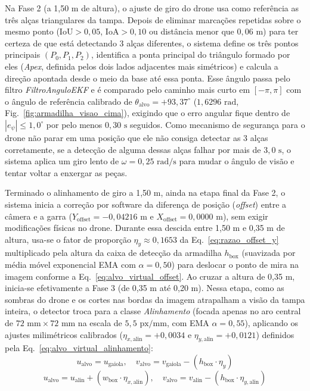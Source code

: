 Na Fase 2 (a 1,50 m de altura), o ajuste de giro do drone usa como referência as três alças triangulares da tampa. Depois de eliminar marcações repetidas sobre o mesmo ponto ($\text{IoU} > 0{,}05$, $\text{IoA} > 0{,}10$ ou distância menor que $0{,}06\text{ m}$) para ter certeza de que está detectando 3 alças diferentes, o sistema define os três pontos principais $(P_0, P_1, P_2)$, identifica a ponta principal do triângulo formado por eles (\textit{Apex}, definida pelos dois lados adjacentes mais simétricos) e calcula a direção apontada desde o meio da base até essa ponta. Esse ângulo passa pelo filtro \textit{FiltroAnguloEKF} e é comparado pelo caminho mais curto em $[-\pi, \pi]$ com o ângulo de referência calibrado de $\theta_{\text{alvo}} = +93{,}37^\circ$ ($1{,}6296\text{ rad}$, Fig.~\ref{fig:armadilha_visao_cima}), exigindo que o erro angular fique dentro de $|e_\psi| \le 1{,}0^\circ$ por pelo menos $0{,}30\text{ s}$ seguidos. Como mecanismo de segurança para o drone não parar em uma posição que ele não consiga detectar as 3 alças corretamente, se a detecção de alguma dessas alças falhar por mais de $3{,}0\text{ s}$, o sistema aplica um giro lento de $\omega = 0{,}25\text{ rad/s}$ para mudar o ângulo de visão e tentar voltar a enxergar as peças.

Terminado o alinhamento de giro a 1,50 m, ainda na etapa final da Fase 2, o sistema inicia a correção por software da diferença de posição (\textit{offset}) entre a câmera e a garra ($Y_{\text{offset}} = -0{,}04216\text{ m}$ e $X_{\text{offset}} = 0{,}0000\text{ m}$), sem exigir modificações físicas no drone. Durante essa descida entre 1,50 m e 0,35 m de altura, usa-se o fator de proporção $\eta_y \approx 0{,}1653$ da Eq.~\ref{eq:razao_offset_y} multiplicado pela altura da caixa de detecção da armadilha $h_{\text{box}}$ (suavizada por média móvel exponencial EMA com $\alpha = 0{,}50$) para deslocar o ponto de mira na imagem conforme a Eq.~\ref{eq:alvo_virtual_offset}. Ao cruzar a altura de 0,35 m, inicia-se efetivamente a Fase 3 (de 0,35 m até 0,20 m). Nessa etapa, como as sombras do drone e os cortes nas bordas da imagem atrapalham a visão da tampa inteira, o detector troca para a classe \textit{Alinhamento} (focada apenas no aro central de $72\text{ mm} \times 72\text{ mm}$ na escala de $5{,}5\text{ px/mm}$, com EMA $\alpha = 0{,}55$), aplicando os ajustes milimétricos calibrados ($\eta_{x,\text{alin}} = +0{,}0034$ e $\eta_{y,\text{alin}} = +0{,}0121$) definidos pela Eq.~\ref{eq:alvo_virtual_alinhamento}:
\begin{equation}
	u_{\text{alvo}} = u_{\text{gaiola}}, \quad v_{\text{alvo}} = v_{\text{gaiola}} - (h_{\text{box}} \cdot \eta_y)
	\label{eq:alvo_virtual_offset}
\end{equation}
\begin{equation}
	u_{\text{alvo}} = u_{\text{alin}} + (w_{\text{box}} \cdot \eta_{x,\text{alin}}), \quad v_{\text{alvo}} = v_{\text{alin}} - (h_{\text{box}} \cdot \eta_{y,\text{alin}})
	\label{eq:alvo_virtual_alinhamento}
\end{equation}

